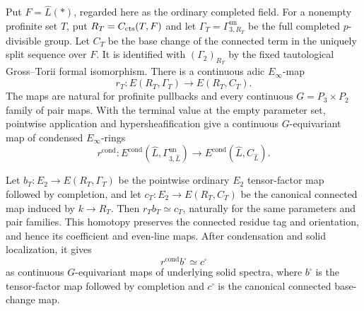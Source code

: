 \begin{lemma}
\label{lem:completed-oriented-map}
Put \(F=\widehat L(*)\), regarded here as the ordinary completed field.
For a nonempty profinite set \(T\), put \(R_T=C_{\mathrm{cts}}(T,F)\) and let
\(\Gamma_T=\Gamma^{\mathrm{un}}_{3,R_T}\) be the full completed
\(p\)-divisible group. Let \(C_T\) be the base change of the connected
term in the uniquely split sequence over \(F\). It is identified with
\((\Gamma_2)_{R_T}\) by the fixed tautological Gross--Torii formal
isomorphism. There is a continuous adic \(E_\infty\)-map
\[
 r_T:E(R_T,\Gamma_T)\longrightarrow E(R_T,C_T).
\]
The maps are natural for profinite pullbacks and every continuous
\(G=P_3\times P_2\) family of pair maps. With the terminal value at the
empty parameter set, pointwise application and hypersheafification give
a continuous \(G\)-equivariant map of condensed \(E_\infty\)-rings
\[
 r^{\mathrm{cond}}:
 E^{\mathrm{cond}}(\widehat L,\Gamma^{\mathrm{un}}_{3,\widehat L})
 \longrightarrow E^{\mathrm{cond}}(\widehat L,C_{\widehat L}).
\]

Let \(b_T:E_2\to E(R_T,\Gamma_T)\) be the pointwise ordinary
\(E_2\) tensor-factor map followed by completion, and let
\(c_T:E_2\to E(R_T,C_T)\) be the canonical connected map induced by
\(k\to R_T\). Then \(r_Tb_T\simeq c_T\), naturally for the same
parameters and pair families. This homotopy preserves the connected
residue tag and orientation, and hence its coefficient and even-line maps.
After condensation and solid localization, it gives
\[
 r^{\mathrm{cond}}b^\square\simeq c^\square
\]
as continuous \(G\)-equivariant maps of underlying solid spectra, where
\(b^\square\) is the tensor-factor map followed by completion and
\(c^\square\) is the canonical connected base-change map.
\end{lemma}

